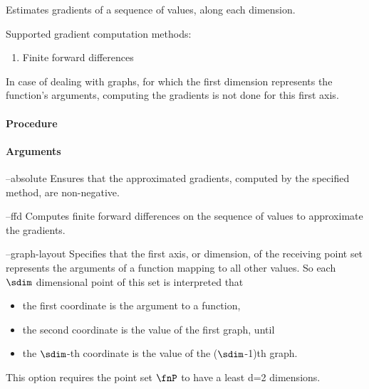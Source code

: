 Estimates gradients of a sequence of values, along each dimension.

Supported gradient computation methods:

\begin{enumerate}
  \item Finite forward differences
\end{enumerate} 

In case of dealing with graphs, for which the first dimension represents the function’s arguments, computing the gradients is not done for this first axis.

\paragraph{Procedure}

\begin{synopsis}
\end{synopsis}

\paragraph{Arguments}

\begin{procarg}{--absolute}
  Ensures that the approximated gradients, computed by the specified method, are non-negative.
\end{procarg}

\begin{procarg}{--ffd}
  Computes finite forward differences on the sequence of values to approximate the gradients.
\end{procarg}

\begin{procarg}{--graph-layout}
  Specifies that the first axis, or dimension, of the receiving point set represents the arguments of a function mapping to all other values. So each $\sdim$ dimensional point of this set is interpreted that

\begin{itemize}
  \item the first coordinate is the argument to a function,
  \item the second coordinate is the value of the first graph, until
  \item the $\sdim$-th coordinate is the value of the ($\sdim$-1)th graph.
\end{itemize}

This option requires the point set $\fnP$ to have a least d=2 dimensions.
\end{procarg}

